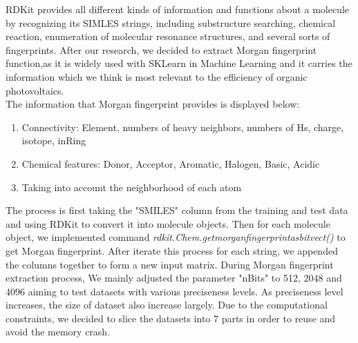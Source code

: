 \documentclass[11pt]{article}
\begin{document}
\begin{enumerate}
RDKit provides all different kinds of information and functions about a molecule by recognizing its SIMLES strings, including substructure searching, chemical reaction, enumeration of molecular resonance structures, and several sorts of fingerprints. After our research, we decided to extract Morgan fingerprint function,as it is widely used with SKLearn in Machine Learning and it carries the information which we think is most relevant to the efficiency of organic photovoltaics. \\ 

The information that Morgan fingerprint provides is displayed below:
\begin{enumerate}
\item Connectivity: Element, numbers of heavy neighbors, numbers of Hs, charge, isotope, inRing
\item Chemical features: Donor, Acceptor, Aromatic, Halogen, Basic, Acidic
\item Taking into account the neighborhood of each atom\\
\end{enumerate}
The process is first taking the "SMILES" column from the training and test data and using RDKit to convert it into molecule objects. Then for each molecule object, we implemented command {\itshape rdkit.Chem.getmorganfingerprintasbitvect()} to get Morgan fingerprint. After iterate this process for each string, we appended the columns together to form a new input matrix. During Morgan fingerprint extraction process, We mainly adjusted the parameter "nBits" to 512, 2048 and 4096 aiming to test datasets with various preciseness levels. As preciseness level increases, the size of dataset also increase largely. Due to the computational constraints, we decided to slice the datasets into 7 parts in order to reuse and avoid the memory crash. \\

\end{enumerate}
\end{document}
